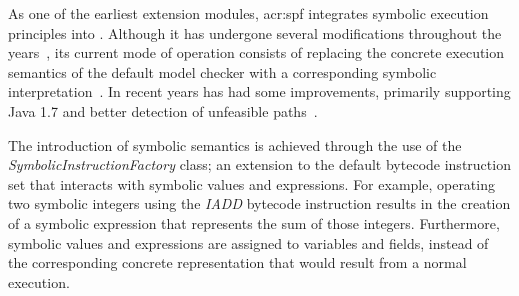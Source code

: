 




As one of the earliest extension modules, \acrfull{acr:spf} integrates symbolic execution principles into \jpf{}. Although it has undergone several modifications throughout the years~\cite{Khurshid2003,Pasareanu2008,Anand2007}, its current mode of operation consists of replacing the concrete execution semantics of the default \jpf{} model checker with a corresponding symbolic interpretation~\cite{Pasareanu2010}. In recent years \spf{} has had some improvements, primarily supporting Java 1.7 and better detection of unfeasible paths~\cite{Luckow2014}.

The introduction of symbolic semantics is achieved through the use of the \textit{SymbolicInstructionFactory} class; an extension to the default bytecode instruction set that interacts with symbolic values and expressions. For example, operating two symbolic integers using the \textit{IADD} bytecode instruction results in the creation of a symbolic expression that represents the sum of those integers. Furthermore, symbolic values and expressions are assigned to variables and fields, instead of the corresponding concrete representation that would result from a normal execution.

